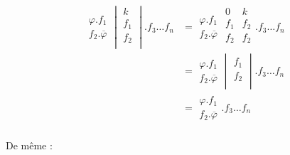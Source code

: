 \begin{spreadlines}{12pt}
 \begin{alignat*}{2} \begin{array}{|c} 
                         \varphi . f_1 \\ f_2 . \overline{\varphi}
                    \end{array}
                     \begin{vmatrix}
                        k\\  f_1 \\  f_2 \\
                    \end{vmatrix}. f_3\ldots f_n 
                   &=   \begin{array}{|c} 
                            \varphi . f_1 \\
                            f_2 . \overline{\varphi}
                        \end{array}
                        \begin{array}{|c|c|} 
                            0 & k  \\
                            f_1 & f_2 \\
                            f_2 & f_2 \\
                        \end{array} . f_3\ldots f_n  \\
                   &= \begin{array}{|c} 
                         \varphi . f_1 \\ f_2 . \overline{\varphi}
                    \end{array}
                     \begin{vmatrix}
                     f_1 \\  f_2 \\
                    \end{vmatrix}. f_3\ldots f_n  \\
                         &= \begin{array}{|c|} 
                         \varphi . f_1 \\ f_2 . \overline{\varphi}
                    \end{array}
                   . f_3\ldots f_n  \\
\end{alignat*}
\end{spreadlines}

De même : 

